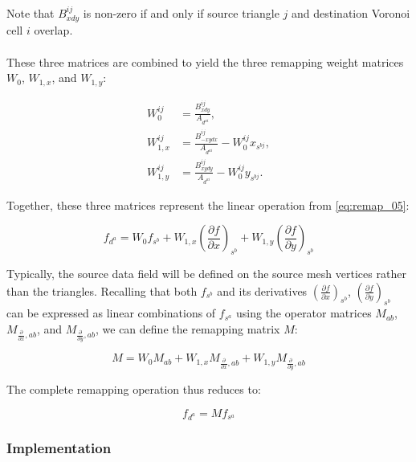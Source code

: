 \documentclass{article}
\begin{document}
Note that $B_{xdy}^{ij}$ is non-zero if and only if source triangle $j$ and destination Voronoi cell $i$ overlap.\\
\\
These three matrices are combined to yield the three remapping weight matrices $W_0$, $W_{1,x}$, and $W_{1,y}$:

\begin{align} \label{eq:remap_07}
W_0^{ij} &= \frac{B_{xdy}^{ij}}{A_{d^{ai}}}, \\
W_{1,x}^{ij} &= \frac{B_{-xydx}^{ij}}{A_{d^{ai}}} - W_0^{ij} x_{s^{bj}}, \\
W_{1,y}^{ij} &= \frac{B_{xydy}^{ij}}{A_{d^{ai}}} - W_0^{ij} y_{s^{bj}}.
\end{align}

Together, these three matrices represent the linear operation from \eqref{eq:remap_05}:

\begin{equation} \label{eq:remap_08}
f_{d^a} = W_0 f_{s^b} + W_{1,x} {\left( \frac{\partial f}{\partial x} \right)}_{s^b} 
+ W_{1,y} {\left( \frac{\partial f}{\partial y} \right)}_{s^b}
\end{equation}

Typically, the source data field will be defined on the source mesh vertices rather than the triangles. Recalling that both $f_{s^b}$ and its derivatives ${\left( \frac{\partial f}{\partial x} \right)}_{s^b}$, ${\left( \frac{\partial f}{\partial y} \right)}_{s^b}$ can be expressed as linear combinations of $f_{s^a}$ using the operator matrices $M_{ab}$, $M_{\frac{\partial}{\partial x},ab}$, and $M_{\frac{\partial}{\partial y},ab}$, we can define the remapping matrix $M$:

\begin{equation} \label{eq:remap_09}
M = W_0 M_{ab} + W_{1,x} M_{\frac{\partial}{\partial x},ab} + W_{1,y} M_{\frac{\partial}{\partial y},ab}
\end{equation}

The complete remapping operation thus reduces to:

\begin{equation} \label{eq:remap_10}
f_{d^a} = M f_{s^a}
\end{equation}

\subsubsection{Implementation}
\end{document}
